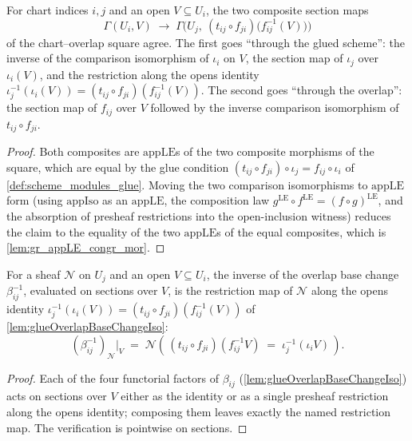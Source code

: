 \begin{lemma}
  \label{lem:gr_overlap_appIso_compat}
  For chart indices \(i, j\) and an open \(V \subseteq U_i\), the two composite
  section maps
  \[
    \Gamma(U_i, V)\;\longrightarrow\;
      \Gamma\bigl(U_j,\ (t_{ij}\circ f_{ji})\bigl(f_{ij}^{-1}(V)\bigr)\bigr)
  \]
  of the chart--overlap square agree. The first goes ``through the glued scheme'':
  the inverse of the comparison isomorphism of \(\iota_i\) on \(V\), the section map of
  \(\iota_j\) over \(\iota_i(V)\), and the restriction along the opens identity
  \(\iota_j^{-1}(\iota_i(V)) = (t_{ij}\circ f_{ji})(f_{ij}^{-1}(V))\). The second goes
  ``through the overlap'': the section map of \(f_{ij}\) over \(V\) followed by the
  inverse comparison isomorphism of \(t_{ij}\circ f_{ji}\).
\end{lemma}
\begin{proof}
  \leanok
  Both composites are \(\mathrm{appLE}\)s of the two composite morphisms of the square,
  which are equal by the glue condition \((t_{ij}\circ f_{ji})\circ \iota_j =
  f_{ij}\circ \iota_i\) of \cref{def:scheme_modules_glue}. Moving the two comparison
  isomorphisms to \(\mathrm{appLE}\) form (using \(\mathrm{appIso}\) as an
  \(\mathrm{appLE}\), the composition law \(g^{\mathrm{LE}}\circ f^{\mathrm{LE}} =
  (f\circ g)^{\mathrm{LE}}\), and the absorption of presheaf restrictions into the
  open-inclusion witness) reduces the claim to the equality of the two
  \(\mathrm{appLE}\)s of the equal composites, which is \cref{lem:gr_appLE_congr_mor}.
\end{proof}

\begin{lemma}
  \label{lem:gr_overlapBaseChange_inv_app}
  For a sheaf \(\mathcal{N}\) on \(U_j\) and an open \(V \subseteq U_i\), the inverse
  of the overlap base change \(\beta_{ij}^{-1}\), evaluated on sections over \(V\), is
  the restriction map of \(\mathcal{N}\) along the opens identity
  \(\iota_j^{-1}(\iota_i(V)) = (t_{ij}\circ f_{ji})(f_{ij}^{-1}(V))\) of
  \cref{lem:glueOverlapBaseChangeIso}:
  \[
    (\beta_{ij}^{-1})_{\mathcal{N}}\big|_V
      \;=\;
    \mathcal{N}\!\left(\,(t_{ij}\circ f_{ji})(f_{ij}^{-1}V) \;=\; \iota_j^{-1}(\iota_i V)\,\right).
  \]
\end{lemma}
\begin{proof}
  \leanok
  Each of the four functorial factors of \(\beta_{ij}\) (\cref{lem:glueOverlapBaseChangeIso})
  acts on sections over \(V\) either as the identity or as a single presheaf
  restriction along the opens identity; composing them leaves exactly the named
  restriction map. The verification is pointwise on sections.
\end{proof}

